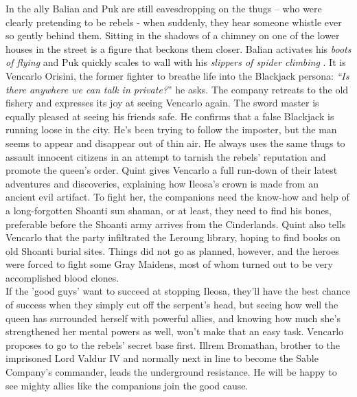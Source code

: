 In the ally Balian and Puk are still eavesdropping on the thugs -- who were clearly pretending to be rebels - when suddenly, they hear someone whistle ever so gently behind them. Sitting in the shadows of a chimney on one of the lower houses in the street is a figure that beckons them closer. Balian activates his {\itshape boots of flying} and Puk quickly scales to wall with his  {\itshape slippers of spider climbing} . It is Vencarlo Orisini, the former fighter to breathe life into the Blackjack persona: {\itshape``Is there anywhere we can talk in private?}'' he asks. The company retreats to the old fishery and expresses its joy at seeing Vencarlo again. The sword master is equally pleased at seeing his friends safe. He confirms that a false Blackjack is running loose in the city. He's been trying to follow the imposter, but the man seems to appear and disappear out of thin air. He always uses the same thugs to assault innocent citizens in an  attempt to tarnish the rebels' reputation and promote the queen's order. Quint gives Vencarlo a full run-down of their latest adventures and discoveries, explaining how Ileosa's crown is made from an ancient evil artifact. To fight her, the companions need the know-how and help of a long-forgotten Shoanti sun shaman, or at least, they need to find his bones, preferable before the Shoanti army arrives from the Cinderlands. Quint also tells Vencarlo that the party infiltrated the Leroung library, hoping to find books on old Shoanti burial sites. Things did not go as planned, however, and the heroes were forced to fight some Gray Maidens, most of whom turned out to be very accomplished blood clones.\\

If the 'good guys' want to succeed at stopping Ileosa, they'll have the best chance of success when they simply cut off the serpent's head, but seeing how well the queen has surrounded herself with powerful allies, and knowing how much she's strengthened her mental powers as well, won't make that an easy task. Vencarlo proposes to go to the rebels' secret base first. Illrem Bromathan, brother to the imprisoned Lord Valdur IV and normally next in line to become the Sable Company's commander, leads the underground resistance. He will be happy to see mighty allies like the companions join the good cause.\\

